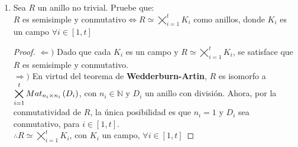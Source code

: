 \documentclass{article}
\begin{document}
\begin{enumerate}[label=\textbf{Ej \arabic*.}]
\begin{proof}
\begin{lem}
				Sean $M,N\in Mod(R)$ tales que $M$ es inyectivo y $M\simeq N$. Entonces $N$ es inyectivo.
			\end{lem}
		\end{proof}
		\item Sea $R$ un anillo no trivial. Pruebe que:\\
		$R$ es semisimple y conmutativo$\Leftrightarrow R \simeq \displaystyle\bigtimes_{i=1}^{t} K_{i}$ como anillos, donde $K_{i}$ es un campo $\forall i \in [1,t]$
		\begin{proof}
			$\boxed{\Leftarrow )}$ Dado que cada $K_{i}$ es un campo y $R \simeq \displaystyle\bigtimes_{i=1}^{t} K_{i}$, se satisface que $R$ es semisimple y conmutativo.\\
			
			$\boxed{\Rightarrow )}$ En virtud del teorema de \textbf{Wedderburn-Artin}, $R$ es isomorfo a $\displaystyle\bigtimes_{i=1}^{t} Mat_{n_{i} \times n_{i}} \left(D_{i}\right)$, con $n_{i}\in\mathbb{N}$ y $D_{i}$ un anillo con división. Ahora, por la conmutatividad de $R$, la única posibilidad es que $n_{i}=1$ y $D_{i}$ sea conmutativo, para $i \in [1,t]$.\\
			$\therefore R \simeq \displaystyle\bigtimes_{i=1}^{t} K_{i}$, con $K_{i}$ un campo, $\forall i \in [1,t]$
		\end{proof}
	\end{enumerate}
\end{document}
